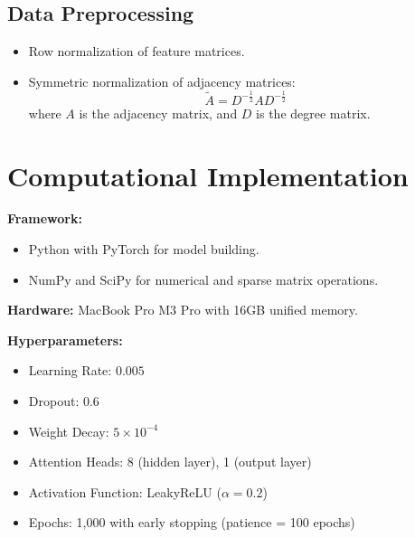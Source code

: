 \documentclass[12pt]{article}
\begin{document}
\subsection{Data Preprocessing}
\begin{itemize}[leftmargin=1.5em]
    \item Row normalization of feature matrices.
    \item Symmetric normalization of adjacency matrices:
    \[
    \tilde{A} = D^{-\frac{1}{2}} A D^{-\frac{1}{2}}
    \]
    where \( A \) is the adjacency matrix, and \( D \) is the degree matrix.
\end{itemize}

\section{Computational Implementation}
\textbf{Framework:}
\begin{itemize}[leftmargin=1.5em]
    \item Python with PyTorch for model building.
    \item NumPy and SciPy for numerical and sparse matrix operations.
\end{itemize}

\textbf{Hardware:} MacBook Pro M3 Pro with 16GB unified memory.

\textbf{Hyperparameters:}
\begin{itemize}[leftmargin=1.5em]
    \item Learning Rate: \(0.005\)
    \item Dropout: \(0.6\)
    \item Weight Decay: \(5 \times 10^{-4}\)
    \item Attention Heads: 8 (hidden layer), 1 (output layer)
    \item Activation Function: LeakyReLU (\( \alpha = 0.2 \))
    \item Epochs: 1,000 with early stopping (patience = 100 epochs)
\end{itemize}
\end{document}
